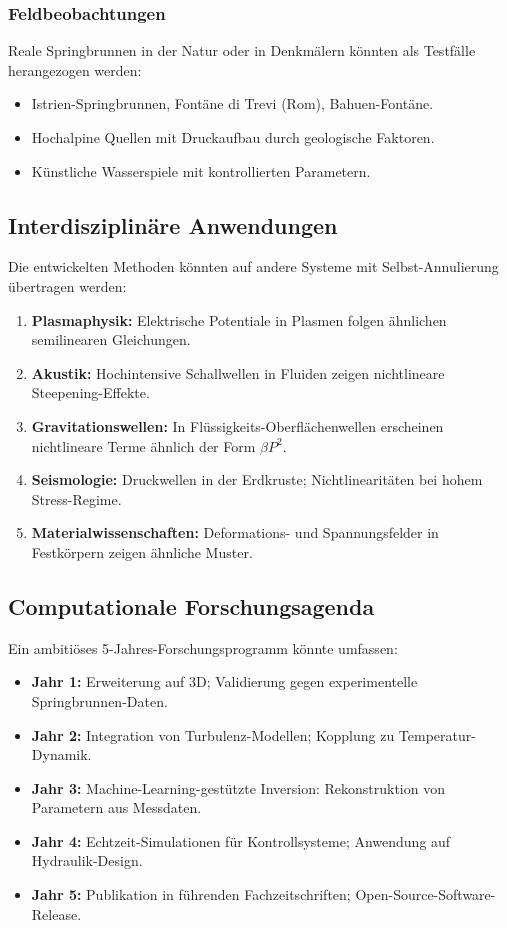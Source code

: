 \documentclass[a4paper,12pt]{article}
\theoremstyle{definition}
\begin{document}
\subsubsection{Feldbeobachtungen}

Reale Springbrunnen in der Natur oder in Denkmälern könnten als Testfälle herangezogen werden:

\begin{itemize}
	\item Istrien-Springbrunnen, Fontäne di Trevi (Rom), Bahuen-Fontäne.
	\item Hochalpine Quellen mit Druckaufbau durch geologische Faktoren.
	\item Künstliche Wasserspiele mit kontrollierten Parametern.
\end{itemize}

\subsection{Interdisziplinäre Anwendungen}

Die entwickelten Methoden könnten auf andere Systeme mit Selbst-Annulierung übertragen werden:

\begin{enumerate}
	\item \textbf{Plasmaphysik:} Elektrische Potentiale in Plasmen folgen ähnlichen semilinearen Gleichungen.
	\item \textbf{Akustik:} Hochintensive Schallwellen in Fluiden zeigen nichtlineare Steepening-Effekte.
	\item \textbf{Gravitationswellen:} In Flüssigkeits-Oberflächenwellen erscheinen nichtlineare Terme ähnlich der Form $\beta P^2$.
	\item \textbf{Seismologie:} Druckwellen in der Erdkruste; Nichtlinearitäten bei hohem Stress-Regime.
	\item \textbf{Materialwissenschaften:} Deformations- und Spannungsfelder in Festkörpern zeigen ähnliche Muster.
\end{enumerate}

\subsection{Computationale Forschungsagenda}

Ein ambitiöses 5-Jahres-Forschungsprogramm könnte umfassen:

\begin{itemize}
	\item \textbf{Jahr 1:} Erweiterung auf 3D; Validierung gegen experimentelle Springbrunnen-Daten.
	\item \textbf{Jahr 2:} Integration von Turbulenz-Modellen; Kopplung zu Temperatur-Dynamik.
	\item \textbf{Jahr 3:} Machine-Learning-gestützte Inversion: Rekonstruktion von Parametern aus Messdaten.
	\item \textbf{Jahr 4:} Echtzeit-Simulationen für Kontrollsysteme; Anwendung auf Hydraulik-Design.
	\item \textbf{Jahr 5:} Publikation in führenden Fachzeitschriften; Open-Source-Software-Release.
\end{itemize}
\end{document}
